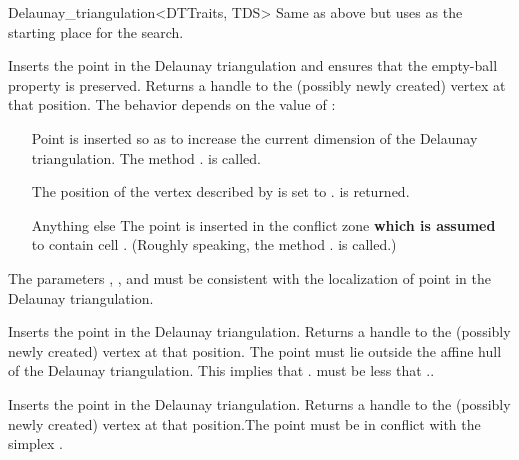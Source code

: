 \begin{ccRefClass}{Delaunay_triangulation<DTTraits, TDS>}
%
{Same as above but uses  as the starting place for the search.}

\begin{ccAdvanced}

{Inserts the point  in the Delaunay triangulation
and ensures that the empty-ball property is preserved.
Returns a handle to the
(possibly newly created) vertex at that position. The behavior depends on the
value of :\begin{itemize} \item[\ccc{OUTSIDE_AFFINE_HULL}] Point
 is inserted so as to increase the current dimension of the Delaunay
triangulation. The method \ccVar. is called.
\item[\ccc{ON_VERTEX}] The position of the vertex  described by 
is set to .  is returned. \item[Anything else] The point 
is inserted in the conflict zone \textbf{which is assumed} to contain cell
. (Roughly speaking, the method \ccVar.
is called.)\end{itemize} \ccPrecond The parameters , , 
and  must be consistent with the localization of point  in the
Delaunay triangulation.}

{Inserts the point  in the Delaunay triangulation. Returns a handle to the
(possibly newly created) vertex at that position. \ccPrecond The point 
must lie outside the affine hull of the Delaunay triangulation. This implies that
\ccVar. must be less that
\ccVar..}

{Inserts the point  in the Delaunay triangulation. Returns a handle to the
(possibly newly created) vertex at that position.\ccPrecond The point 
must be in conflict with the simplex .}

\end{ccAdvanced}




\end{ccRefClass}
